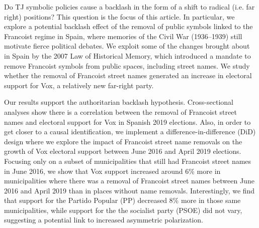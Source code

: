 \documentclass[12pt, notitlepage]{article}
\begin{document}

Do TJ symbolic policies cause a backlash in the form of a shift to radical (i.e. far right) positions?
This question is the focus of this article.
In particular, we explore a potential backlash effect of the removal of public symbols linked to the Francoist regime in Spain, where memories of the Civil War (1936--1939) still motivate fierce political debates. We exploit some of the changes brought about in Spain by the 2007 Law of Historical Memory, which introduced a mandate to remove Francoist symbols from public spaces, including street names. We study whether the removal of Francoist street names generated an increase in electoral support for Vox, a relatively new far-right party.

Our results support the authoritarian backlash hypothesis.
Cross-sectional analyses show there is a correlation between the removal of Francoist street names and electoral support for Vox in Spanish 2019 elections.
Also, in order to get closer to a causal identification, we implement a difference-in-difference (DiD) design where we explore the impact of Francoist street name removals on the growth of Vox electoral support between June 2016 and April 2019 elections.
Focusing only on a subset of municipalities that still had Francoist street names in June 2016, we show that Vox support increased around 6\% more in municipalities where there was a removal of Francoist street names between June 2016 and April 2019 than in places without name removals.
Interestingly, we find that support for the Partido Popular (PP) decreased 8\% more in those same municipalities, while support for the the socialist party (PSOE) did not vary, suggesting a potential link to increased asymmetric polarization.
\end{document}
